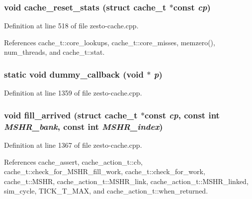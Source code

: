 \subsubsection[{cache\_\-reset\_\-stats}]{\setlength{\rightskip}{0pt plus 5cm}void cache\_\-reset\_\-stats (struct {\bf cache\_\-t} $\ast$const  {\em cp})}\label{zesto-cache_8cpp_aff01697c94f19565dfd6d631bf4bf76}




Definition at line 518 of file zesto-cache.cpp.

References cache\_\-t::core\_\-lookups, cache\_\-t::core\_\-misses, memzero(), num\_\-threads, and cache\_\-t::stat.
\subsubsection[{dummy\_\-callback}]{\setlength{\rightskip}{0pt plus 5cm}static void dummy\_\-callback (void $\ast$ {\em p})\hspace{0.3cm}{\tt  [static]}}\label{zesto-cache_8cpp_2ca1ae8eb0053c08276d5e170a5f98d8}




Definition at line 1359 of file zesto-cache.cpp.
\subsubsection[{fill\_\-arrived}]{\setlength{\rightskip}{0pt plus 5cm}void fill\_\-arrived (struct {\bf cache\_\-t} $\ast$const  {\em cp}, \/  const int {\em MSHR\_\-bank}, \/  const int {\em MSHR\_\-index})}\label{zesto-cache_8cpp_4d5f99649851ca3db130a4a6228a1f35}




Definition at line 1367 of file zesto-cache.cpp.

References cache\_\-assert, cache\_\-action\_\-t::cb, cache\_\-t::check\_\-for\_\-MSHR\_\-fill\_\-work, cache\_\-t::check\_\-for\_\-work, cache\_\-t::MSHR, cache\_\-action\_\-t::MSHR\_\-link, cache\_\-action\_\-t::MSHR\_\-linked, sim\_\-cycle, TICK\_\-T\_\-MAX, and cache\_\-action\_\-t::when\_\-returned.
